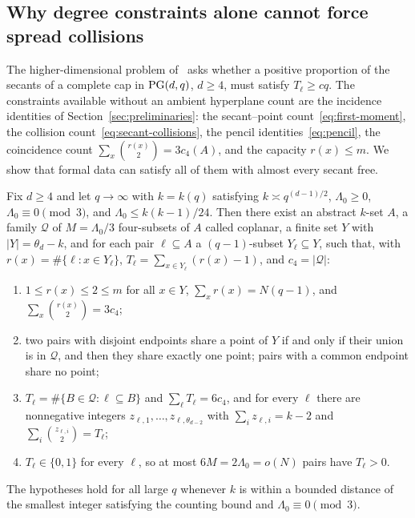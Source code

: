 \subsection{Why degree constraints alone cannot force spread collisions}

The higher-dimensional problem of~\cite{RuddSecantDefects} asks whether a
positive proportion of the secants of a complete cap in \(\mathrm{PG}(d,q)\),
\(d\ge4\), must satisfy \(T_\ell\ge cq\).  The constraints available
without an ambient hyperplane count are the incidence identities of
Section~\ref{sec:preliminaries}: the secant--point
count~\eqref{eq:first-moment}, the collision
count~\eqref{eq:secant-collisions}, the pencil identities~\eqref{eq:pencil},
the coincidence count \(\sum_{x}\binom{r(x)}{2}=3c_4(A)\), and the
capacity \(r(x)\le m\).  We show that formal data can satisfy all of
them with almost every secant free.

\begin{proposition}
\label{prop:degree-countermodel}
Fix \(d\ge4\) and let \(q\to\infty\) with \(k=k(q)\) satisfying
\(k\asymp q^{(d-1)/2}\), \(\Lambda_0\ge0\), \(\Lambda_0\equiv0\pmod3\),
and \(\Lambda_0\le k(k-1)/24\).  Then there exist an abstract \(k\)-set
\(A\), a family \(\mathcal Q\) of \(M=\Lambda_0/3\) four-subsets of \(A\)
called coplanar, a finite set \(Y\) with \(|Y|=\theta_d-k\), and for each
pair \(\ell\subseteq A\) a \((q-1)\)-subset \(Y_\ell\subseteq Y\), such
that, with \(r(x)=\#\{\ell:x\in Y_\ell\}\),
\(T_\ell=\sum_{x\in Y_\ell}(r(x)-1)\), and \(c_4=|\mathcal Q|\):
\begin{enumerate}[label=(\alph*),nosep]
\item \(1\le r(x)\le2\le m\) for all \(x\in Y\), \(\sum_xr(x)=N(q-1)\),
 and \(\sum_x\binom{r(x)}{2}=3c_4\);
\item two pairs with disjoint endpoints share a point of \(Y\) if and
 only if their union is in \(\mathcal Q\), and then they share exactly one
 point; pairs with a common endpoint share no point;
\item \(T_\ell=\#\{B\in\mathcal Q:\ell\subseteq B\}\) and
 \(\sum_\ell T_\ell=6c_4\), and for every \(\ell\) there are nonnegative
 integers \(z_{\ell,1},\dots,z_{\ell,\theta_{d-2}}\) with
 \(\sum_iz_{\ell,i}=k-2\) and \(\sum_i\binom{z_{\ell,i}}{2}=T_\ell\);
\item \(T_\ell\in\{0,1\}\) for every \(\ell\), so at most
 \(6M=2\Lambda_0=o(N)\) pairs have \(T_\ell>0\).
\end{enumerate}
The hypotheses hold for all large \(q\) whenever \(k\) is within a
bounded distance of the smallest integer satisfying the counting bound
and \(\Lambda_0\equiv0\pmod3\).
\end{proposition}

